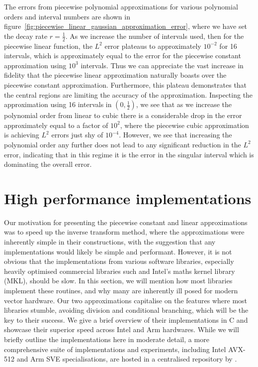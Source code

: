 \documentclass[manuscript,review]{acmart}
\begin{document}
The errors from piecewise polynomial approximations for various polynomial orders and interval numbers are shown in figure~\ref{fig:piecewise_linear_gaussian_approximation_error}, where we have set the decay rate $ r = \tfrac{1}{2} $. As we increase the number of intervals used, then for the piecewise linear function, the $ L^2 $ error plateaus to approximately $ 10^{-2} $ for 16 intervals, which is approximately equal to the error for the piecewise constant approximation using $ 10^3 $ intervals. Thus we can appreciate the vast increase in fidelity that the piecewise linear approximation naturally boasts over the piecewise constant approximation. Furthermore, this plateau demonstrates that the central regions are limiting the accuracy of the approximation. Inspecting the approximation using 16 intervals in $ (0, \tfrac{1}{2}) $, we see that as we increase the polynomial order from linear to cubic there is a considerable drop in the error approximately equal to a factor of $ 10^2 $, where the piecewise cubic approximation is achieving $ L^2 $ errors just shy of $ 10^{-4} $. However, we see that increasing the polynomial order any further does not lead to any significant reduction in the $ L^2 $ error, indicating that in this regime it is the error in the singular interval which is dominating the overall error. 

\section{High performance implementations}
\label{sec:high_performance_impementations}

Our motivation for presenting the piecewise constant and linear approximations was to speed up the inverse transform method, where the approximations were inherently simple in their constructions, with the suggestion that any implementations would likely be simple and performant. However, it is not obvious that the implementations from various software libraries, especially heavily optimised commercial libraries such and Intel's maths kernel library (MKL), should be slow. In this section, we will mention how most libraries implement these routines, and why many are inherently ill posed for modern vector hardware. Our two approximations capitalise on the features where most libraries stumble, avoiding division and conditional branching, which will be the key to their success. We give a brief overview of their implementations in C and showcase their superior speed across Intel and Arm hardwares. While we will briefly outline the implementations here in moderate detail, a more comprehensive suite of implementations and experiments, including Intel AVX-512 and Arm SVE specialisations, are hosted in a centralised repository by \citet{sheridan2020approximate_random}.
\end{document}
